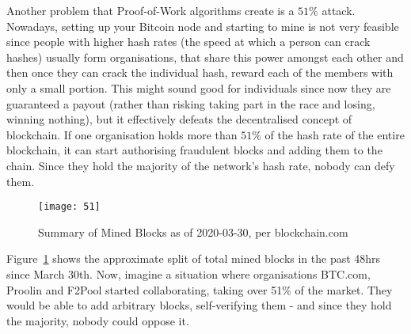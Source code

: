 Another problem that Proof-of-Work algorithms create is a $51\%$ attack. Nowadays, setting up your Bitcoin node and starting to mine is not very feasible since people with higher hash rates (the speed at which a person can crack hashes) usually form organisations, that share this power amongst each other and then once they can crack the individual hash, reward each of the members with only a small portion. This might sound good for individuals since now they are guaranteed a payout (rather than risking taking part in the race and losing, winning nothing), but it effectively defeats the decentralised concept of blockchain. If one organisation holds more than $51\%$ of the hash rate of the entire blockchain, it can start authorising fraudulent blocks and adding them to the chain. Since they hold the majority of the network's hash rate, nobody can defy them. 

\begin{figure}[h]
    \centering
    \texttt{[image: 51]}
    \caption{Summary of Mined Blocks as of 2020-03-30, per blockchain.com}
    \label{fig:51}
\end{figure}

Figure~\ref{fig:51} shows the approximate split of total mined blocks in the past 48hrs since March 30th. Now, imagine a situation where organisations BTC.com, Proolin and F2Pool started collaborating, taking over 51\% of the market. They would be able to add arbitrary blocks, self-verifying them - and since they hold the majority, nobody could oppose it.
